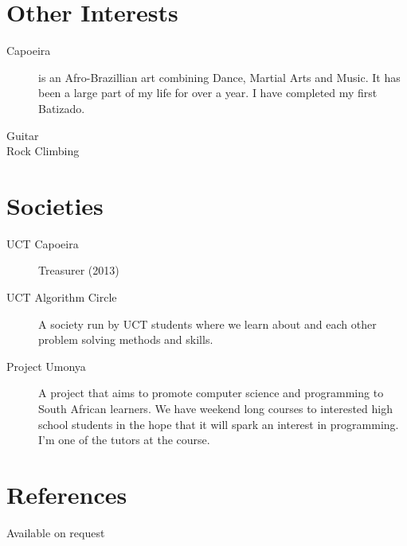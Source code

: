 \documentclass[margin,line,a4paper]{resume}
\begin{document}
\begin{resume}
        \section{\mysidestyle Other Interests}
            \begin{description}
                \item[Capoeira] is an Afro-Brazillian art combining Dance, Martial Arts and Music. It has
                    been a large part of my life for over a year. I have completed my first Batizado.
                \item[Guitar]
                \item[Rock Climbing]
            \end{description}

        \section{\mysidestyle Societies}
            \begin{description}
                \item [UCT Capoeira] Treasurer (2013)
                \item [UCT Algorithm Circle] A society run by UCT students where we learn about and
                each other problem solving methods and skills.

                \item [Project Umonya] A project that aims to promote computer science and programming
                to South African learners. We have weekend long courses to interested high school students
                in the hope that it will spark an interest in programming. I'm one of the tutors at the course.
            \end{description}

        \section{\mysidestyle References}
            Available on request
    \end{resume}
\end{document}
